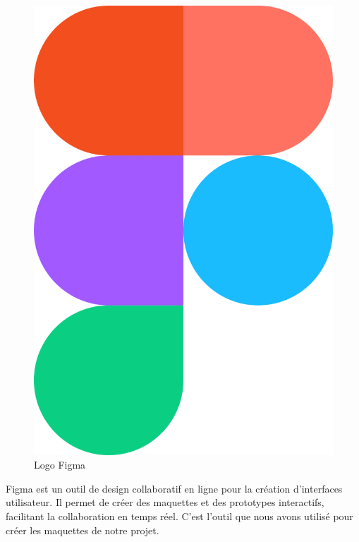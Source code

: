 \begin{figure}[htbp]
   \centering
   \includegraphics[scale=0.03]{Images/figma.png} 
   \caption{Logo Figma\cite{figma}}
   \label{fig:figma}
\end{figure}
Figma est un outil de design collaboratif en ligne pour la 
création d'interfaces utilisateur. Il permet de créer des 
maquettes et des prototypes interactifs, facilitant la 
collaboration en temps réel\cite{figma}. C'est l'outil que nous avons utilisé 
pour créer les maquettes de notre projet.
\newline

